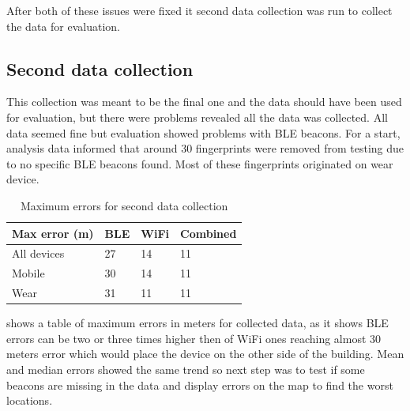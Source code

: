 After both of these issues were fixed it second data collection was run to collect the data for evaluation.

\subsection{Second data collection}\label{sec:SecondDataCollection}
This collection was meant to be the final one and the data should have been used for evaluation, but there were problems revealed all the data was collected. All data seemed fine but evaluation showed problems with BLE beacons. For a start, analysis data informed that around 30 fingerprints were removed from testing due to no specific BLE beacons found. Most of these fingerprints originated on wear device.

\begin{table}[h]
	\begin{center}
		\begin{tabular}{ l C{2cm} C{2cm} C{2cm} }
			\hline
			Max error (m) & BLE & WiFi & Combined \\ 
			\hline
			All devices & 27 & 14 & 11 \\ 
			Mobile & 30 & 14 & 11 \\ 
			Wear & 31 & 11 & 11 \\ 
			\hline
		\end{tabular}
		\caption{Maximum errors for second data collection}
		\label{tab01c06}
	\end{center}
\end{table} 

 shows a table of maximum errors in meters for collected data, as it shows BLE errors can be two or three times higher then of WiFi ones reaching almost 30 meters error which would place the device on the other side of the building. Mean and median errors showed the same trend so next step was to test if some beacons are missing in the data and display errors on the map to find the worst locations.

